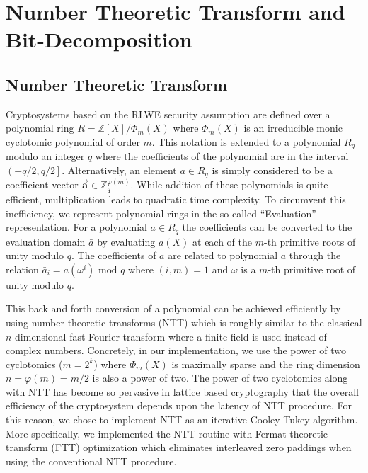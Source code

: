 \section{Number Theoretic Transform and Bit-Decomposition} \label{sec:lowerMath}

\subsection{Number Theoretic Transform}

Cryptosystems based on the RLWE security assumption are defined over a polynomial ring $R = \mathbb{Z}\left[ X \right] / \Phi_m\left( X\right) $ where $\Phi_m\left( X\right)$ is an irreducible monic cyclotomic polynomial of order $m$. This notation is extended to a polynomial $R_q$ modulo an integer $q$ where the coefficients of the polynomial are in the interval
$\left(-q/2,q/2\right]$. Alternatively, an element $a \in R_q$ is simply considered to be a coefficient vector $\vec{\mathbf{a}} \in \mathbb{Z}_q^{\varphi\left( m \right)}$. While addition of these polynomials is quite efficient, multiplication leads to quadratic time complexity. To circumvent this inefficiency, we represent polynomial rings in the so called ``Evaluation'' representation. For a polynomial $a \in R_q$ the coefficients can be converted to the evaluation domain $\bar{a}$ by evaluating $a\left(X\right)$ at each of the $m$-th primitive roots of unity modulo $q$. The coefficients of $\bar{a}$ are related to polynomial $a$ through the relation $\bar{a}_i = a\left( \omega^i \right) \text{ mod } q$ where $\left(i,m\right)=1$ and $\omega$ is a $m$-th primitive root of unity modulo $q$. 

This back and forth conversion of a polynomial can be achieved efficiently by using number theoretic transforms (NTT) which is roughly similar to the classical $n$-dimensional fast Fourier transform where a finite field is used instead of complex numbers. Concretely, in our implementation, we use the power of two cyclotomics ($m = 2^k$) where $\Phi_m\left(X\right)$ is maximally sparse and the ring dimension $n = \varphi\left( m\right) = m/2$ is also a power of two. The power of two cyclotomics along with NTT has become so pervasive in lattice based cryptography that the overall efficiency of the cryptosystem depends upon the latency of NTT procedure. For this reason, we chose to implement NTT as an iterative Cooley-Tukey algorithm. More specifically, we implemented the NTT routine with Fermat theoretic transform (FTT) optimization which eliminates interleaved zero paddings when using the conventional NTT procedure.

